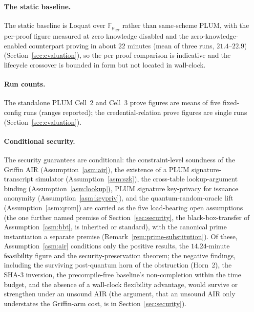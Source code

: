 \paragraph{The static baseline.}
The static baseline is Loquat over $\mathbb{F}_{p_{127}}$ rather than same-scheme PLUM, with the per-proof figure measured at zero knowledge disabled and the zero-knowledge-enabled counterpart proving in about $22$ minutes (mean of three runs, $21.4$--$22.9$) (Section~\ref{sec:evaluation}), so the per-proof comparison is indicative and the lifecycle crossover is bounded in form but not located in wall-clock.

\paragraph{Run counts.}
The standalone PLUM Cell~2 and Cell~3 prove figures are means of five fixed-config runs (ranges reported); the credential-relation prove figures are single runs (Section~\ref{sec:evaluation}).

\paragraph{Conditional security.}
The security guarantees are conditional: the constraint-level soundness of the Griffin AIR (Assumption~\ref{asm:air}), the existence of a PLUM signature-transcript simulator (Assumption~\ref{asm:szk}), the cross-table lookup-argument binding (Assumption~\ref{asm:lookup}), PLUM signature key-privacy for issuance anonymity (Assumption~\ref{asm:keypriv}), and the quantum-random-oracle lift (Assumption~\ref{asm:qrom}) are carried as the five load-bearing open assumptions (the one further named premise of Section~\ref{sec:security}, the black-box-transfer of Assumption~\ref{asm:bbt}, is inherited or standard), with the canonical prime instantiation a separate premise (Remark~\ref{rem:prime-substitution}). Of these, Assumption~\ref{asm:air} conditions only the positive results, the $14.24$-minute feasibility figure and the security-preservation theorem; the negative findings, including the surviving post-quantum horn of the obstruction (Horn~2), the SHA-3 inversion, the precompile-free baseline's non-completion within the time budget, and the absence of a wall-clock flexibility advantage, would survive or strengthen under an unsound AIR (the argument, that an unsound AIR only understates the Griffin-arm cost, is in Section~\ref{sec:security}).

